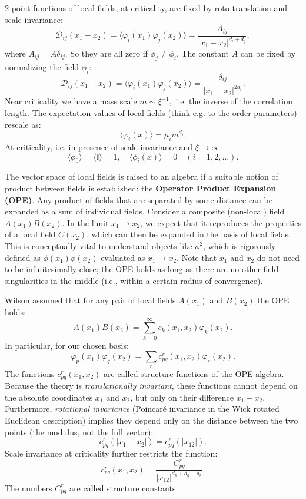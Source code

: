 2-point functions of local fields, at criticality, are fixed by roto-translation and scale invariance:
\[
    \mathcal{D}_{ij}(x_{1}-x_{2})=\langle\varphi_{i}(x_{1})\varphi_{j}(x_{2})\rangle=\frac{A_{ij}}{|x_{1}-x_{2}|^{d_{i}+d_{j}}},
\]
where \(A_{ij}=A\delta_{ij}\). So they are all zero if \(\phi_{j}\ne\phi_{i}\). The constant \(A\) can be fixed by normalizing the field \(\phi_{i}\):
\[
    \mathcal{D}_{ij}(x_{1}-x_{2})=\langle\varphi_{i}(x_{1})\varphi_{j}(x_{2})\rangle=\frac{\delta_{ij}}{|x_{1}-x_{2}|^{2d_{i}}}.
\]
Near criticality we have a mass scale \(m\sim\xi^{-1},\) i.e. the inverse of the correlation length. The expectation values of local fields (think e.g. to the order parameters) rescale as:
\[
    \langle\varphi_{i}(x)\rangle=\mu_{i}m^{d_{i}}.
\]
At criticality, i.e. in presence of scale invariance and \(\xi\rightarrow\infty\):
\[
    \langle\phi_{0}\rangle=\langle\mathbb{I}\rangle=1, \quad \langle\phi_{i}(x)\rangle=0 \quad (i=1,2,\dots).
\]

The vector space of local fields is raised to an algebra if a suitable notion of product between fields is established: the \textbf{Operator Product Expansion (OPE)}.
Any product of fields that are separated by some distance can be expanded as a sum of individual fields. Consider a composite (non-local) field \(A(x_{1})B(x_{2})\). In the limit \(x_{1}\rightarrow x_{2}\), we expect that it reproduces the properties of a local field \(C(x_{2})\), which can then be expanded in the basis of local fields. This is conceptually vital to understand objects like \(\phi^2\), which is rigorously defined as \(\phi(x_1)\phi(x_2)\) evaluated as \(x_1 \to x_2\). Note that \(x_1\) and \(x_2\) do not need to be infinitesimally close; the OPE holds as long as there are no other field singularities in the middle (i.e., within a certain radius of convergence).

Wilson assumed that for any pair of local fields \(A(x_{1})\) and \(B(x_{2})\) the OPE holds:
\[
    A(x_{1})B(x_{2})=\sum_{k=0}^{\infty}c_{k}(x_{1},x_{2})\varphi_{k}(x_{2}).
\]
In particular, for our chosen basis:
\[
    \varphi_{p}(x_{1})\varphi_{q}(x_{2})=\sum_{r}c_{pq}^{r}(x_{1},x_{2})\varphi_{r}(x_{2}).
\]
The functions \(c_{pq}^{r}(x_{1},x_{2})\) are called structure functions of the OPE algebra. Because the theory is \textit{translationally invariant}, these functions cannot depend on the absolute coordinates \(x_1\) and \(x_2\), but only on their difference \(x_1 - x_2\). Furthermore, \textit{rotational invariance} (Poincar\'e invariance in the Wick rotated Euclidean description) implies they depend only on the distance between the two points (the modulus, not the full vector):
\[
    c_{pq}^{r}(|x_{1}-x_{2}|)=c_{pq}^{r}(|x_{12}|).
\]
Scale invariance at criticality further restricts the function:
\[
    c_{pq}^{r}(x_{1},x_{2})=\frac{C_{pq}^{r}}{|x_{12}|^{d_{p}+d_{q}-d_{r}}}.
\]
The numbers \(C_{pq}^{r}\) are called structure constants.

